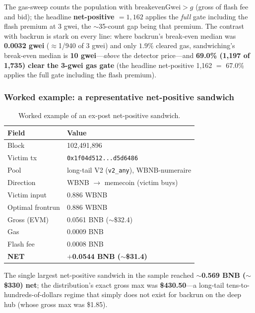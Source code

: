 \documentclass[11pt]{article}
\newcommand{\code}[1]{\texttt{#1}}
\begin{document}
\noindent The gas-sweep counts the population with $\text{breakevenGwei}>g$ (gross of
flash fee and bid); the headline \textbf{net-positive $=1{,}162$} applies the
\emph{full} gate including the flash premium at 3 gwei, the $\sim$35-count gap being
that premium. The contrast with backrun is stark on every line: where backrun's
break-even median was \textbf{0.0032 gwei} ($\approx$1/940 of 3 gwei) and only
$1.9\%$ cleared gas, sandwiching's break-even median is \textbf{10 gwei}---\emph{above}
the detector price---and \textbf{69.0\% (1{,}197 of 1{,}735) clear the 3-gwei gas
gate} (the headline net-positive 1{,}162 $=$ 67.0\% applies the full gate including
the flash premium).

\subsubsection{Worked example: a representative net-positive sandwich}
\begin{table}[h]\centering
\caption{Worked example of an ex-post net-positive sandwich.}\label{tab:swexample}
\begin{tabular}{ll}
\toprule
Field & Value \\
\midrule
Block & 102{,}491{,}896 \\
Victim tx & \code{0x1f04d512...d5d6486} \\
Pool & long-tail V2 (\code{v2\_any}), WBNB-numeraire \\
Direction & WBNB $\to$ memecoin (victim buys) \\
Victim input & 0.886 WBNB \\
Optimal frontrun & 0.886 WBNB \\
Gross (EVM) & 0.0561 BNB ($\sim$\$32.4) \\
Gas & 0.0009 BNB \\
Flash fee & 0.0008 BNB \\
\textbf{NET} & \textbf{$+$0.0544 BNB ($\sim$\$31.4)} \\
\bottomrule
\end{tabular}
\end{table}

\noindent The single largest net-positive sandwich in the sample reached
\textbf{$\sim$0.569 BNB ($\sim$\$330) net}; the distribution's exact gross max was
\textbf{\$430.50}---a long-tail tens-to-hundreds-of-dollars regime that simply does
not exist for backrun on the deep hub (whose gross max was \$1.85).
\end{document}
